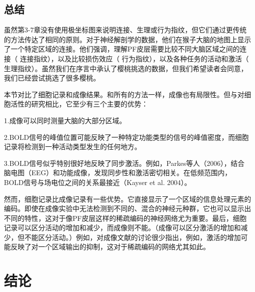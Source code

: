 \subsection{总结}
虽然第3-7章没有使用极坐标图来说明连接、生理或行为指纹，但它们通过更传统的方法传达了相同的原则。对于神经解剖学的数据，他们在猴子大脑的地图上显示了一个特定区域的连接。他们强调，理解PF皮层需要比较不同大脑区域之间的连接（ 连接指纹），以及比较损伤效应（ 行为指纹），以及各种任务的活动和激活（ 生理指纹）。虽然我们在序言中承认了樱桃挑选的数据，但我们希望读者会同意，我们已经尝试挑选了很多樱桃。
\par
本节对比了细胞记录和成像结果。和所有的方法一样，成像也有局限性。但与对细胞活性的研究相比，它至少有三个主要的优势：
\par 1.成像可以同时测量大脑的大部分区域。
\par 2.BOLD信号的峰值位置可能反映了一种特定功能类型的信号的峰值密度，而细胞记录将检测到一种活动类型发生的任何地方。
\par 3.BOLD信号似乎特别很好地反映了同步激活。例如，Parkes等人（2006），结合脑电图（EEG）和功能成像，发现同步性和激活密切相关。在低频范围内，BOLD信号与场电位之间的关系最接近（Kayser et al. 2004）。
\par 然而，细胞记录比成像记录有一些优势。它直接显示了一个区域的信息处理元素的编码。即使在成像实验中无法检测到不同的、混合的神经元种群，它也可以显示出不同的特性，这对于像PF皮层这样的稀疏编码的神经网络尤为重要。最后，细胞记录可以区分活动的增加和减少，而成像则不能。（成像可以区分激活的增加和减少，但不能区分活动。）例如，对成像文献的讨论很少指出，例如，激活的增加可能反映了对一个区域输出的抑制，这对于稀疏编码的网络尤其如此。

\section{结论}


